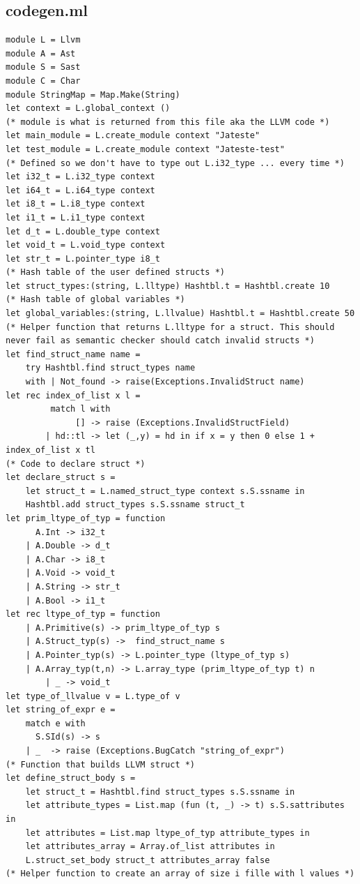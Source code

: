 \documentclass{article}
\begin{document}
\subsection{codegen.ml}
\begin{lstlisting}
module L = Llvm
module A = Ast
module S = Sast
module C = Char
module StringMap = Map.Make(String)
let context = L.global_context () 
(* module is what is returned from this file aka the LLVM code *)
let main_module = L.create_module context "Jateste" 
let test_module = L.create_module context "Jateste-test" 
(* Defined so we don't have to type out L.i32_type ... every time *)
let i32_t = L.i32_type context
let i64_t = L.i64_type context
let i8_t = L.i8_type context
let i1_t = L.i1_type context
let d_t = L.double_type context
let void_t = L.void_type context
let str_t = L.pointer_type i8_t 
(* Hash table of the user defined structs *)
let struct_types:(string, L.lltype) Hashtbl.t = Hashtbl.create 10
(* Hash table of global variables *)
let global_variables:(string, L.llvalue) Hashtbl.t = Hashtbl.create 50
(* Helper function that returns L.lltype for a struct. This should never fail as semantic checker should catch invalid structs *)
let find_struct_name name = 
	try Hashtbl.find struct_types name
	with | Not_found -> raise(Exceptions.InvalidStruct name)
let rec index_of_list x l = 
         match l with
           	  [] -> raise (Exceptions.InvalidStructField)
 		| hd::tl -> let (_,y) = hd in if x = y then 0 else 1 + index_of_list x tl
(* Code to declare struct *)
let declare_struct s =
	let struct_t = L.named_struct_type context s.S.ssname in
	Hashtbl.add struct_types s.S.ssname struct_t
let prim_ltype_of_typ = function
	  A.Int -> i32_t
	| A.Double -> d_t
	| A.Char -> i8_t
	| A.Void -> void_t
	| A.String -> str_t
	| A.Bool -> i1_t
let rec ltype_of_typ = function
	| A.Primitive(s) -> prim_ltype_of_typ s
	| A.Struct_typ(s) ->  find_struct_name s
	| A.Pointer_typ(s) -> L.pointer_type (ltype_of_typ s)
	| A.Array_typ(t,n) -> L.array_type (prim_ltype_of_typ t) n
    	| _ -> void_t 
let type_of_llvalue v = L.type_of v
let string_of_expr e =
	match e with
	  S.SId(s) -> s
	| _  -> raise (Exceptions.BugCatch "string_of_expr")
(* Function that builds LLVM struct *)
let define_struct_body s =
	let struct_t = Hashtbl.find struct_types s.S.ssname in
	let attribute_types = List.map (fun (t, _) -> t) s.S.sattributes in
	let attributes = List.map ltype_of_typ attribute_types in		
	let attributes_array = Array.of_list attributes in 
	L.struct_set_body struct_t attributes_array false
(* Helper function to create an array of size i fille with l values *)

\end{lstlisting}
\end{document}

